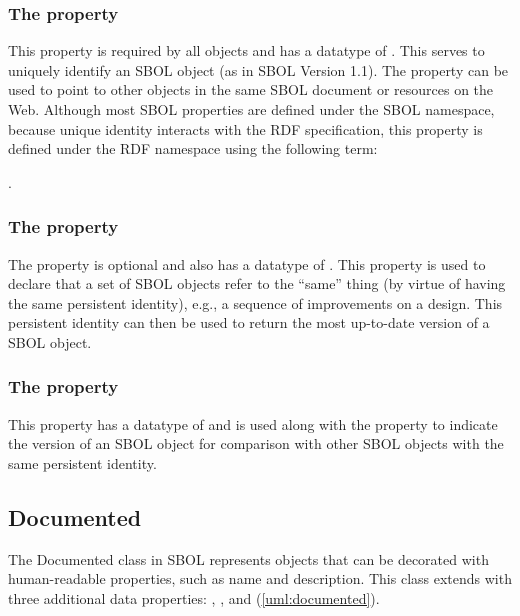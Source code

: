 \subsubsection*{The  property}
\label{sec:identity}
This property is required by all  objects and has a datatype of . This  serves to uniquely identify an SBOL object (as in SBOL Version 1.1). The  property can be used to point to other objects in the same SBOL document or resources on the Web. Although most SBOL properties are defined under the SBOL namespace, because unique identity interacts with the RDF specification, this property is defined under the RDF namespace using the following term:

.


\subsubsection*{The  property}
\label{sec:persistentIdentity}
The  property is optional and also has a datatype of . This property is used to declare that a set of SBOL objects refer to the ``same'' thing (by virtue of having the same persistent identity), e.g., a sequence of improvements on a design. This persistent identity can then be used to return the most up-to-date version of a SBOL object.



\subsubsection*{The  property}
\label{sec:version}
This property has a datatype of  and is used along with the  property to indicate the version of an SBOL object for comparison with other SBOL objects with the same persistent identity.

\subsection {Documented}
\label{sec:Documented}
The Documented class in SBOL represents objects that can be decorated with human-readable properties, such as name and description. This class extends  with three additional data properties: , , and  (\ref{uml:documented}). 

